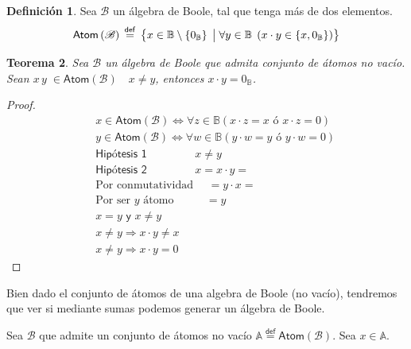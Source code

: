 \documentclass[final,12pt,a4paper,twoside,fleqn]{extbook}
\newcommand{\sthen}{\ensuremath{\Longrightarrow}}
\newcommand{\mathdef}{\ensuremath{\stackrel{\mathsf{def}}{{}={}}}}
\newcommand{\then}{\ensuremath{\sthen}}
\newcommand{\set}[1]{\ensuremath{\left\lbrace{#1}\right\rbrace}}
\newcommand {\setCompr}[2]{
	\ensuremath{
		\left\lbrace{ 
			#1 {\;\big{\vert}\;} #2
        }\right\rbrace
    }
}
\newcommand{\setB}{\ensuremath{\mathbb{B}}}
\newcommand{\algB}{\ensuremath{\mathscr{B}}}
\newtheorem{thm}{Teorema}[chapter]
\theoremstyle{definition}
\newtheorem{defn}[thm]{Definición}
\theoremstyle{remark}
\begin{document}
\begin{defn}
Sea \(\algB\) un álgebra de Boole, tal que tenga más de dos elementos.
\begin{equation}
  \mathsf{Atom}\left(\algB\right) \mathdef \setCompr{x \in \setB \setminus
  \set{0_\setB}} {\forall y \in \setB \; \left( x \cdot y \in \set{ x ,
  0_\setB } \right)}
\end{equation}
\end{defn}




\begin{thm}
Sea \(\algB\) un álgebra de Boole que admita conjunto de átomos no vacío.
Sean \(x \, y \; \in \mathsf{Atom}\left({\algB}\right)\quad x\neq y\),
entonces \(x \cdot y = 0_\setB\).
\end{thm}



\begin{proof}
\begin{eqnarray}
&&x \in \mathsf{Atom}\left({\algB}\right) \iff \forall z \in \setB \left(x
\cdot z = x \textsf{ ó } x \cdot z = 0\right) \\
&&y \in \mathsf{Atom}\left({\algB}\right) \iff \forall w \in \setB \left(y
\cdot w = y \textsf{ ó } y \cdot w = 0\right) \\
&&\textsf{Hipótesis   1   } \qquad\qquad x \neq y \\
&&\textsf{Hipótesis   2   } \qquad\qquad x = x \cdot y = \\
&&\text{Por conmutatividad   } \quad = y \cdot x = \\
&&\text{Por ser \(y\) átomo  } \;\;\qquad = y \\
&& x = y \textsf{ y } x \neq y \\
&& x \neq y \then x \cdot y \neq x \\
&& x \neq y \then x \cdot y = 0
\end{eqnarray}
\end{proof}





	Bien dado el conjunto de átomos de una algebra de Boole (no vacío),
tendremos que ver si mediante sumas podemos generar un álgebra de Boole.



	Sea \( \algB \) que admite un conjunto de átomos no vacío \( \mathbb{A}
\mathdef \mathsf{Atom} \left( \algB \right) \). Sea \( x \in \mathbb{A} \).
\end{document}
